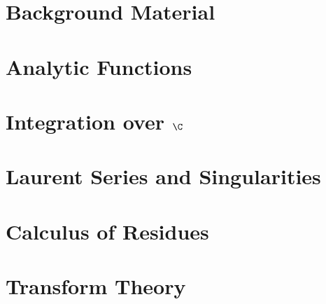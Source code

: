 \documentclass[british,11pt,a4paper]{report}
\begin{document}
\maketitle
\tableofcontents

\chapter{Background Material}

\chapter{Analytic Functions}

\chapter{Integration over \texorpdfstring{$\C$}{C}}

\chapter{Laurent Series and Singularities}

\chapter{Calculus of Residues}

\chapter{Transform Theory}

\end{document}
